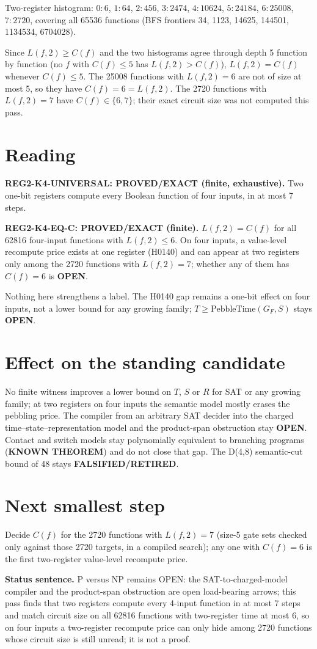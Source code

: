 \documentclass[11pt]{article}
\begin{document}
Two-register histogram: $0{:}6$, $1{:}64$, $2{:}456$, $3{:}2474$, $4{:}10624$, $5{:}24184$, $6{:}25008$, $7{:}2720$, covering all 65536 functions (BFS frontiers 34, 1123, 14625, 144501, 1134534, 6704028).

Since $L(f,2)\ge C(f)$ and the two histograms agree through depth 5 function by function (no $f$ with $C(f)\le5$ has $L(f,2)>C(f)$), $L(f,2)=C(f)$ whenever $C(f)\le5$. The 25008 functions with $L(f,2)=6$ are not of size at most 5, so they have $C(f)=6=L(f,2)$. The 2720 functions with $L(f,2)=7$ have $C(f)\in\{6,7\}$; their exact circuit size was not computed this pass.

\section*{Reading}
\textbf{REG2-K4-UNIVERSAL: PROVED/EXACT (finite, exhaustive).} Two one-bit registers compute every Boolean function of four inputs, in at most 7 steps.

\textbf{REG2-K4-EQ-C: PROVED/EXACT (finite).} $L(f,2)=C(f)$ for all 62816 four-input functions with $L(f,2)\le6$. On four inputs, a value-level recompute price exists at one register (H0140) and can appear at two registers only among the 2720 functions with $L(f,2)=7$; whether any of them has $C(f)=6$ is \textbf{OPEN}.

Nothing here strengthens a label. The H0140 gap remains a one-bit effect on four inputs, not a lower bound for any growing family; $T\ge\mathrm{PebbleTime}(G_F,S)$ stays \textbf{OPEN}.

\section*{Effect on the standing candidate}
No finite witness improves a lower bound on $T$, $S$ or $R$ for SAT or any growing family; at two registers on four inputs the semantic model mostly erases the pebbling price. The compiler from an arbitrary SAT decider into the charged time--state--representation model and the product-span obstruction stay \textbf{OPEN}. Contact and switch models stay polynomially equivalent to branching programs (\textbf{KNOWN THEOREM}) and do not close that gap. The D(4,8) semantic-cut bound of 48 stays \textbf{FALSIFIED/RETIRED}.

\section*{Next smallest step}
Decide $C(f)$ for the 2720 functions with $L(f,2)=7$ (size-5 gate sets checked only against those 2720 targets, in a compiled search); any one with $C(f)=6$ is the first two-register value-level recompute price.

\bigskip
\noindent\textbf{Status sentence.} P versus NP remains OPEN: the SAT-to-charged-model compiler and the product-span obstruction are open load-bearing arrows; this pass finds that two registers compute every 4-input function in at most 7 steps and match circuit size on all 62816 functions with two-register time at most 6, so on four inputs a two-register recompute price can only hide among 2720 functions whose circuit size is still unread; it is not a proof.
\end{document}
